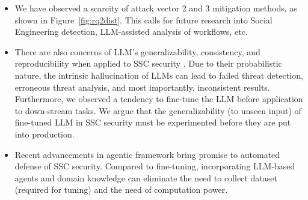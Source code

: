 \begin{itemize}
  \item We have observed a scarcity of attack vector 2 and 3 mitigation
  methods, as shown in Figure~\ref{fig:rq2dist}. This calls for future research
  into Social Engineering detection, LLM-assisted analysis of workflows,
  etc.

  \item There are also concerns of LLM's generalizability,
  consistency, and reproducibility when applied to SSC security \citep{ullah2024llms}.
  Due to their probabilistic nature, the intrinsic hallucination
  of LLMs can lead to failed threat detection, erroneous threat analysis,
  and most importantly, inconsistent results.
  Furthermore, we observed a tendency to fine-tune the LLM before
  application to down-stream tasks. We argue that the generalizability
  (to unseen input) of fine-tuned LLM in SSC security must be experimented before they
  are put into production.

  \item Recent advancements in agentic framework bring promise to
  automated defense of SSC security. Compared to fine-tuning, 
  incorporating LLM-based agents and domain knowledge can eliminate
  the need to collect dataset (required for tuning) and the need of
  computation power.
\end{itemize}


